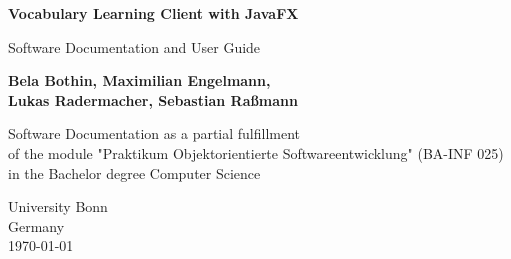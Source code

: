 \begin{titlepage}

    \begin{center}
        \vspace*{1cm}
            
        \Huge
        \textbf{Vocabulary Learning Client with JavaFX}
            
        \vspace{0.5cm}
        \LARGE
        Software Documentation and User Guide
            
        \vspace{1.5cm}
            
        \textbf{Bela Bothin, Maximilian Engelmann,\\Lukas Radermacher, Sebastian Raßmann}
            
        \vfill
            
        Software Documentation as a partial fulfillment
    \\ of the module "Praktikum Objektorientierte Softwareentwicklung" (BA-INF 025) \\
    in the Bachelor degree Computer Science
            
        \vspace{3cm}
        
        \Large
        University Bonn\\
        Germany\\
        \today
            
            
    \end{center}
\end{titlepage}
